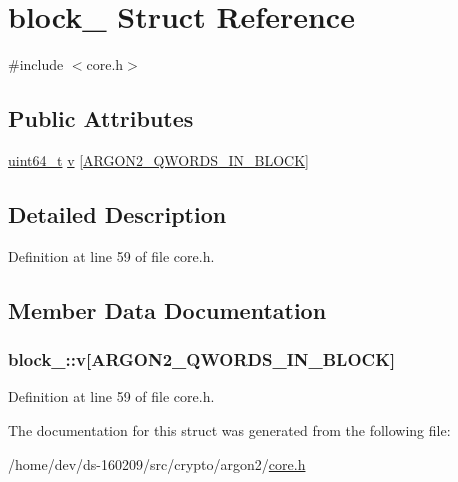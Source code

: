 \hypertarget{structblock__}{}\section{block\+\_\+ Struct Reference}
\label{structblock__}


{\ttfamily \#include $<$core.\+h$>$}

\subsection*{Public Attributes}
\begin{DoxyCompactItemize}
\item 
\hyperlink{stdint_8h_aaa5d1cd013383c889537491c3cfd9aad}{uint64\+\_\+t} \hyperlink{structblock___a2dda5556500153c8ad1323b6310bb549}{v} \mbox{[}\hyperlink{core_8h_a7f5657d0a2dc42b3d802b8200858b93cae7f95c31492458d44a7c7511a9212e18}{A\+R\+G\+O\+N2\+\_\+\+Q\+W\+O\+R\+D\+S\+\_\+\+I\+N\+\_\+\+B\+L\+O\+C\+K}\mbox{]}
\end{DoxyCompactItemize}


\subsection{Detailed Description}


Definition at line 59 of file core.\+h.



\subsection{Member Data Documentation}
\hypertarget{structblock___a2dda5556500153c8ad1323b6310bb549}{}
\subsubsection[{v}]{ block\+\_\+\+::v\mbox{[}{\bf A\+R\+G\+O\+N2\+\_\+\+Q\+W\+O\+R\+D\+S\+\_\+\+I\+N\+\_\+\+B\+L\+O\+C\+K}\mbox{]}}\label{structblock___a2dda5556500153c8ad1323b6310bb549}


Definition at line 59 of file core.\+h.



The documentation for this struct was generated from the following file\+:\begin{DoxyCompactItemize}
\item 
/home/dev/ds-\/160209/src/crypto/argon2/\hyperlink{core_8h}{core.\+h}\end{DoxyCompactItemize}
